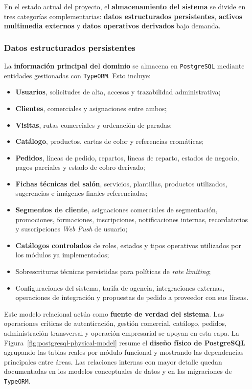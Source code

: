 En el estado actual del proyecto, el \textbf{almacenamiento del sistema} se divide en tres categorías complementarias: \textbf{datos estructurados persistentes}, \textbf{activos multimedia externos} y \textbf{datos operativos derivados} bajo demanda.

\subsubsection*{Datos estructurados persistentes}

La \textbf{información principal del dominio} se almacena en \texttt{PostgreSQL} mediante entidades gestionadas con \texttt{TypeORM}. Esto incluye:

\begin{itemize}
    \item \textbf{Usuarios}, solicitudes de alta, accesos y trazabilidad administrativa;
    \item \textbf{Clientes}, comerciales y asignaciones entre ambos;
    \item \textbf{Visitas}, rutas comerciales y ordenación de paradas;
    \item \textbf{Catálogo}, productos, cartas de color y referencias cromáticas;
    \item \textbf{Pedidos}, líneas de pedido, repartos, líneas de reparto, estados de negocio, pagos parciales y estado de cobro derivado;
    \item \textbf{Fichas técnicas del salón}, servicios, plantillas, productos utilizados, sugerencias e imágenes finales referenciadas;
    \item \textbf{Segmentos de cliente}, asignaciones comerciales de segmentación, promociones, formaciones, inscripciones, notificaciones internas, recordatorios y suscripciones \textit{Web Push} de usuario;
    \item \textbf{Catálogos controlados} de roles, estados y tipos operativos utilizados por los módulos ya implementados;
    \item Sobrescrituras técnicas persistidas para políticas de \textit{rate limiting};
    \item Configuraciones del sistema, tarifa de agencia, integraciones externas, operaciones de integración y propuestas de pedido a proveedor con sus líneas.
\end{itemize}

Este modelo relacional actúa como \textbf{fuente de verdad del sistema}. Las operaciones críticas de autenticación, gestión comercial, catálogo, pedidos, administración transversal y operación empresarial se apoyan en esta capa. La Figura~\ref{fig:postgresql-physical-model} resume el \textbf{diseño físico de PostgreSQL} agrupando las tablas reales por módulo funcional y mostrando las dependencias principales entre áreas. Las relaciones internas con mayor detalle quedan documentadas en los modelos conceptuales de datos y en las migraciones de \texttt{TypeORM}.

